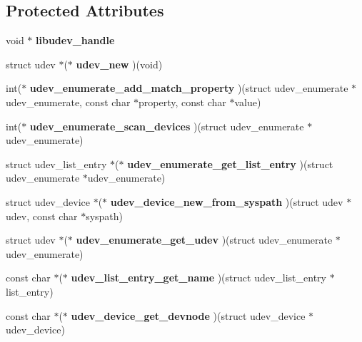 \subsection*{\-Protected \-Attributes}
\begin{DoxyCompactItemize}
\item 
void $\ast$ {\bfseries libudev\-\_\-handle}\label{classpkgUdevCdromDevices_af45e77087fe65829bc11408e2c81256e}

\item 
struct udev $\ast$($\ast$ {\bfseries udev\-\_\-new} )(void)\label{classpkgUdevCdromDevices_a8b52d42dd549097f93ba221f196f8334}

\item 
int($\ast$ {\bfseries udev\-\_\-enumerate\-\_\-add\-\_\-match\-\_\-property} )(struct udev\-\_\-enumerate $\ast$udev\-\_\-enumerate, const char $\ast$property, const char $\ast$value)\label{classpkgUdevCdromDevices_a088ecb9fcbc828d82e94fbecf8191c46}

\item 
int($\ast$ {\bfseries udev\-\_\-enumerate\-\_\-scan\-\_\-devices} )(struct udev\-\_\-enumerate $\ast$udev\-\_\-enumerate)\label{classpkgUdevCdromDevices_ad5da393a67efd3a486a981abc7911b31}

\item 
struct udev\-\_\-list\-\_\-entry $\ast$($\ast$ {\bfseries udev\-\_\-enumerate\-\_\-get\-\_\-list\-\_\-entry} )(struct udev\-\_\-enumerate $\ast$udev\-\_\-enumerate)\label{classpkgUdevCdromDevices_a01c8a895f51879d3d96d1c67485873ac}

\item 
struct udev\-\_\-device $\ast$($\ast$ {\bfseries udev\-\_\-device\-\_\-new\-\_\-from\-\_\-syspath} )(struct udev $\ast$udev, const char $\ast$syspath)\label{classpkgUdevCdromDevices_ac069520527237fd6ccad9f6e9ee36bc2}

\item 
struct udev $\ast$($\ast$ {\bfseries udev\-\_\-enumerate\-\_\-get\-\_\-udev} )(struct udev\-\_\-enumerate $\ast$udev\-\_\-enumerate)\label{classpkgUdevCdromDevices_a40919cfa390a44c07de96fa0c4e8af3c}

\item 
const char $\ast$($\ast$ {\bfseries udev\-\_\-list\-\_\-entry\-\_\-get\-\_\-name} )(struct udev\-\_\-list\-\_\-entry $\ast$list\-\_\-entry)\label{classpkgUdevCdromDevices_adea5822099d32eaa2a880ad29a2046b6}

\item 
const char $\ast$($\ast$ {\bfseries udev\-\_\-device\-\_\-get\-\_\-devnode} )(struct udev\-\_\-device $\ast$udev\-\_\-device)\label{classpkgUdevCdromDevices_a346c643fe7dcfbe1f4337415ce22399a}


\end{DoxyCompactItemize}
